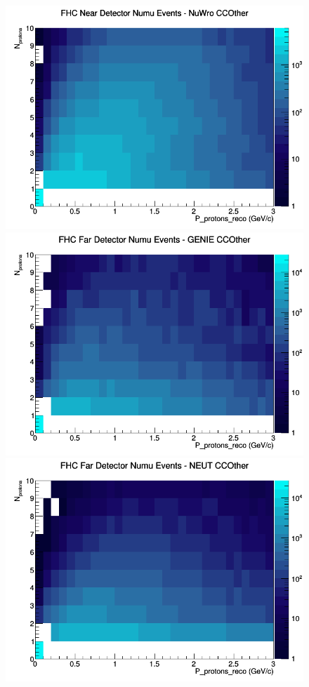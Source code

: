 \begin{figure}[h]
\includegraphics[width=\linewidth]{eff_N_P/GAr/protons/CCOther_FHC_ND_numu_N_P_NuWro.png}
\endminipage
\newline
{}
\includegraphics[width=\linewidth]{eff_N_P/GAr/protons/CCOther_FHC_FD_numu_N_P_GENIE.png}
\endminipage
{}
\includegraphics[width=\linewidth]{eff_N_P/GAr/protons/CCOther_FHC_FD_numu_N_P_NEUT.png}

\end{figure}
